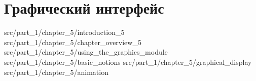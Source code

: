 \chapter{Графический интерфейс}

 {src/part_1/chapter_5/introduction_5}
 {src/part_1/chapter_5/chapter_overview_5}
 {src/part_1/chapter_5/using_the_graphics_module}
 {src/part_1/chapter_5/basic_notions}
 {src/part_1/chapter_5/graphical_display}
 {src/part_1/chapter_5/animation}